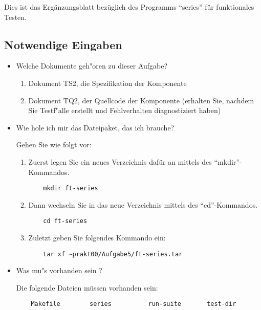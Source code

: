 
Dies ist das Erg\"anzungsblatt bez\"uglich des Programms "`series"'
f\"ur funktionales Testen.

\subsection*{Notwendige Eingaben}

\begin{itemize}

\item Welche Dokumente geh"oren zu dieser Aufgabe?

\begin{enumerate}
\item Dokument TS2, die Spezifikation der Komponente 
\item Dokument TQ2, der Quellcode der Komponente (erhalten Sie, nachdem
	Sie Testf"alle erstellt und Fehlverhalten diagnostiziert haben)
\end{enumerate}

\item Wie hole ich mir das Dateipaket, das ich brauche?

Gehen Sie wie folgt vor:

\begin{enumerate}

\item Zuerst legen Sie ein neues Verzeichnis daf\"ur an mittels des 
"`mkdir"'-Kommandos.
\begin{verbatim}
    mkdir ft-series
\end{verbatim}

\item Dann wechseln Sie in das neue Verzeichnis mittels des 
"`cd"'-Kommandos.
\begin{verbatim}
    cd ft-series
\end{verbatim}

\item Zuletzt geben Sie folgendes Kommando ein:
\begin{verbatim}
    tar xf ~prakt00/Aufgabe5/ft-series.tar
\end{verbatim}

\end{enumerate}

\item Was mu"s vorhanden sein ?

Die folgende Dateien m\"ussen vorhanden sein:
\begin{verbatim}
    Makefile        series          run-suite       test-dir
\end{verbatim}

\end{itemize}


